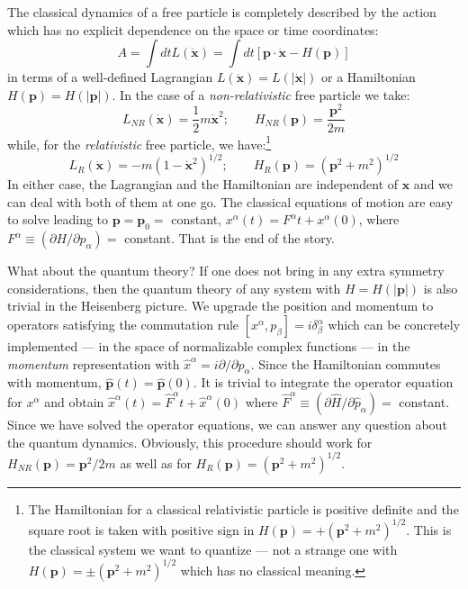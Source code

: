 \documentclass[12pt]{article}
\begin{document}
The classical dynamics of a free  particle is completely described by the action which has no explicit dependence on the space or time coordinates:
 \begin{equation}
  A=\int dt L(\dot {\bm{x}})=\int dt[\bm{p}\cdot \dot{\bm{x}} -H(\bm{p})]
  \end{equation}
 in terms of  a well-defined Lagrangian $L(\dot {\bm{x}}) = L(|\dot{\bm{x}}|)$ or a Hamiltonian $H(\bm{p}) =H(|\bm{p}|) $. In the case of a \textit{non-relativistic} free particle we take:
  \begin{equation}
   L_{NR}(\dot{\bm{x}})= \frac{1}{2} m \dot{\bm{x}}^2; \qquad
  H_{NR}(\bm{p})=\frac{\bm{p}^2}{2m}
 \end{equation} 
 while, for the \textit{relativistic} free particle, we have:\footnote{The Hamiltonian for a classical relativistic particle is positive definite and  the square root is taken with positive sign in $H(\bm{p})=+(\bm{p}^2+m^2)^{1/2}$. This is the classical system we want to quantize --- not a strange one with $H(\bm{p})=\pm(\bm{p}^2+m^2)^{1/2}$ which has no classical meaning.}
  \begin{equation}
   L_{R}(\dot{\bm{x}})= - m (1-\dot{\bm{x}}^2)^{1/2}; \qquad
  H_{R}(\bm{p})=(\bm{p}^2+m^2)^{1/2}
 \end{equation} 
  In either case, the Lagrangian and the Hamiltonian  are independent of $\bm{x}$ and we can deal with both of them at one go. The classical equations of motion are easy to solve leading to $\bm{p}=\bm{p}_0=$ constant, $x^\alpha(t)={F}^\alpha t
  +x^\alpha(0)$,  where ${F}^\alpha\equiv (\partial {H}/\partial {p}_\alpha) = $ constant. That is the end of the story. 

What about the quantum theory? If one does not bring in any extra symmetry considerations, then the quantum theory of any system with $H=H(|\bm{p}|)$ is also trivial in the Heisenberg picture. We upgrade the position and momentum to operators satisfying the commutation rule
 $[x^\alpha, p_\beta]=i\delta^\alpha_\beta$ which can be concretely implemented --- in the space of normalizable complex functions --- in the \textit{momentum} representation with $\hat{x}^\alpha = i \partial/\partial p_\alpha$. Since the Hamiltonian commutes with momentum, $\hat{\bm{p}}(t) = \hat{\bm{p}}(0)$. It is trivial to integrate the operator equation for $x^\alpha$  and obtain $\hat{x}^\alpha(t) = \hat{F}^\alpha t + \hat{x}^\alpha(0)$ where $\hat{F}^\alpha\equiv (\partial \hat{H}/\partial \hat{p}_\alpha) = $ constant. Since we have solved  the operator equations, we can answer any question about the quantum dynamics. Obviously, this procedure should work for $ H_{NR}(\bm{p})=\bm{p}^2/2m$ as well as for $H_{R}(\bm{p})=(\bm{p}^2+m^2)^{1/2}$. 
 
\end{document}
